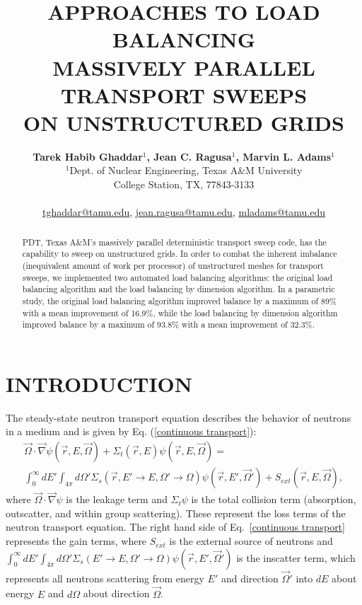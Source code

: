 \documentclass[letterpaper]{mandc2019}
\title{APPROACHES TO LOAD BALANCING \\
MASSIVELY PARALLEL TRANSPORT SWEEPS\\
ON UNSTRUCTURED GRIDS}
\author{%
  \textbf{Tarek Habib Ghaddar$^1$, Jean C. Ragusa$^1$, Marvin L. Adams$^1$} \\
$^1$Dept. of Nuclear Engineering, Texas  A\&M University \\
  College Station, TX, 77843-3133 \\ 
     \\
  \url{tghaddar@tamu.edu}, \url{jean.ragusa@tamu.edu}, \url{mladams@tamu.edu}
}
\newcommand{\vr}{\vec{r}}
\newcommand{\vo}{\vec{\Omega}}
\begin{document}
\maketitle
\justify 

\begin{abstract}
  PDT, Texas A\&M's massively parallel deterministic transport sweep code, has the capability to sweep on unstructured grids. In order to combat the inherent imbalance (inequivalent amount of work per processor) of unstructured meshes for transport sweeps, we implemented two automated load balancing algorithms: the original load balancing algorithm and the load balancing by dimension algorithm. In a parametric study, the original load balancing algorithm improved balance by a maximum of 89\% with a mean improvement of 16.9\%, while the load balancing by dimension algorithm improved balance by a maximum of 93.8\% with a mean improvement of 32.3\%.
\end{abstract}

\section{INTRODUCTION} 
The steady-state neutron transport equation describes the behavior of neutrons in a medium and is given by Eq. (\ref{continuous transport}):
\begin{multline}
\vo \cdot \vec \nabla \psi(\vr,E,\vo) + \Sigma_t(\vr,E) \psi(\vr,E,\vo)  = \\ 
\int_{0}^{\infty}dE' \int_{4\pi}d\Omega' \Sigma_s(\vr,E'\to E, \Omega'\to\Omega)\psi(\vr,E',\vo')  + S_{ext}(\vr,E,\vo) ,
\label{continuous transport}
\end{multline}
where $\vec{\Omega}\cdot \vec\nabla\psi$ is the leakage term and $\Sigma_t\psi$ is the total collision term (absorption, outscatter, and within group scattering). These represent the loss terms of the neutron transport equation. The right hand side of Eq.~\eqref{continuous transport} represents the gain terms, where $S_{ext}$ is the external source of neutrons and $\int_{0}^{\infty}dE'\int_{4\pi}d\Omega'\Sigma_s(E'\to E, \Omega'\to\Omega)\psi(\vr,E',\vo')$ is the inscatter term, which represents all neutrons scattering from energy $E'$ and direction $\vo'$ into $dE$ about energy $E$ and $d\Omega$ about direction $\vo$. 
\end{document}
